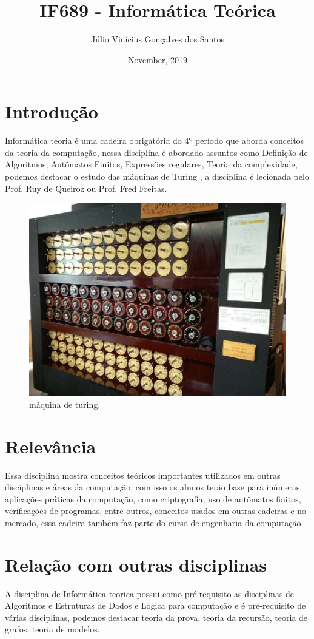 \documentclass{article}
\title{IF689 - Informática Teórica}
\author{Júlio Vinícius Gonçalves dos Santos }
\date{November, 2019}
\begin{document}
\maketitle

\section{Introdução}
\quad Informática teoria é uma cadeira obrigatória do 4º período que aborda conceitos da teoria da computação, nessa disciplina é abordado assuntos como Definição de Algoritmos, Autômatos Finitos, Expressões regulares, Teoria da complexidade, podemos destacar o estudo das máquinas de Turing \citep{cinWiki} , a disciplina é lecionada pelo Prof. Ruy de Queiroz ou Prof. Fred Freitas.\citep{cinWiki2}

\begin{figure}[h!]
\centering
\includegraphics[scale=0.22]{Mturing}
\caption{máquina de turing. \cite{imagem}}
\end{figure}


\section{Relevância}
\quad Essa disciplina mostra conceitos teóricos importantes utilizados em outras disciplinas e áreas da computação, com isso os alunos terão base para inúmeras aplicações práticas da computação, como criptografia, uso de autômatos finitos, verificações de programas, entre outros, conceitos usados em outras cadeiras e no mercado, essa cadeira também faz parte do curso de engenharia da computação.
\section{Relação com outras disciplinas}
\quad A disciplina de Informática teorica possui como pré-requisito as disciplinas de Algoritmos e Estruturas de Dados e Lógica para computação e é pré-requisito de várias disciplinas, podemos destacar teoria da prova, teoria da recursão, teoria de grafos, teoria de modelos. \citep{ufpe}


\end{document}
